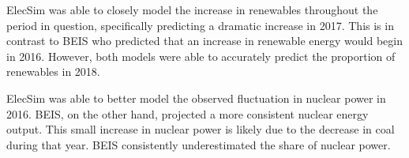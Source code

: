 
ElecSim was able to closely model the increase in renewables throughout the period in question, specifically predicting a dramatic increase in 2017. This is in contrast to BEIS who predicted that an increase in renewable energy would begin in 2016. However, both models were able to accurately predict the proportion of renewables in 2018. 

ElecSim was able to better model the observed fluctuation in nuclear power in 2016. BEIS, on the other hand, projected a more consistent nuclear energy output. This small increase in nuclear power is likely due to the decrease in coal during that year. BEIS consistently underestimated the share of nuclear power. 









%


%




